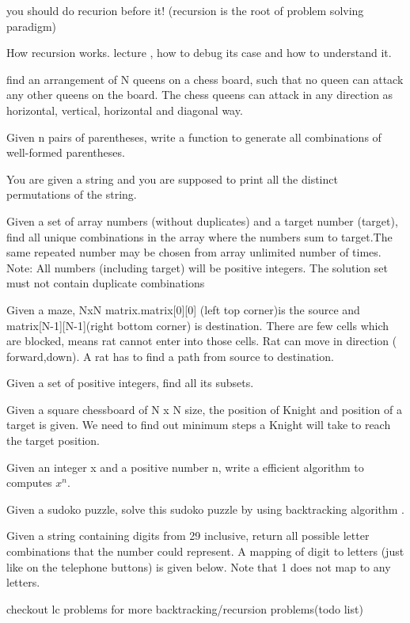 {\begin{exercise}
\begin{compactenum}
    \item you should do recurion before it! (recursion is the root of problem solving paradigm)
    \item How recursion works. lecture , how to debug its case and how to understand it.
    \item find an arrangement of N queens on a chess board, such that no queen can attack any other queens on the board. The chess queens can attack in any direction as horizontal, vertical, horizontal and diagonal way.
    \item Given n pairs of parentheses, write a function to generate all combinations of well-formed parentheses.
    \item You are given a string and you are supposed to print all the distinct permutations of the string.
    \item Given a set of array numbers (without duplicates) and a target number (target), find all unique combinations in the array where the numbers sum to target.The same repeated number may be chosen from array unlimited number of times.
    Note: All numbers (including target) will be positive integers. The solution set must not contain duplicate combinations
    \item Given a maze, NxN matrix.matrix[0][0] (left top corner)is the source and matrix[N-1][N-1](right bottom corner) is destination. There are few cells which are blocked, means rat cannot enter into those cells. Rat can move in direction ( forward,down). A rat has to find a path from source to destination.
    \item Given a set of positive integers, find all its subsets.
    \item Given a square chessboard of N x N size, the position of Knight and position of a target is given. We need to find out minimum steps a Knight will take to reach the target position.
    \item Given an integer x and a positive number n, write a efficient algorithm to computes $x^n$.
    \item Given a sudoko puzzle, solve this sudoko puzzle by using backtracking algorithm .
    \item Given a string containing digits from 29 inclusive, return all possible letter combinations that the number could represent. A mapping of digit to letters (just like on the telephone buttons) is given below. Note that 1 does not map to any letters.
    \item checkout lc problems for more backtracking/recursion problems(todo list)
\end{compactenum}


\end{exercise}}
